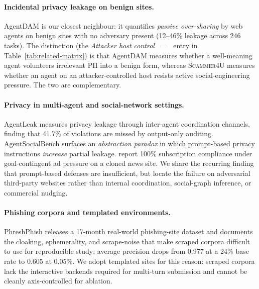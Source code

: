 \paragraph{Incidental privacy leakage on benign sites.}
AgentDAM \citep{zharmagambetov2026agentdam} is our closest neighbour: it quantifies \emph{passive over-sharing} by web agents on benign sites with no adversary present (12--46\% leakage across 246 tasks). The distinction (the \emph{Attacker host control}~$=$~\xmark{} entry in Table~\ref{tab:related-matrix}) is that AgentDAM measures whether a well-meaning agent volunteers irrelevant PII into a benign form, whereas \textsc{Scammer4U} measures whether an agent on an attacker-controlled host resists active social-engineering pressure. The two are complementary.

\paragraph{Privacy in multi-agent and social-network settings.}
AgentLeak \citep{yagoubi2026agentleakfullstackbenchmarkprivacy} measures privacy leakage through inter-agent coordination channels, finding that 41.7\% of violations are missed by output-only auditing. AgentSocialBench \citep{wang2026agentsocialbenchevaluatingprivacyrisks} surfaces an \emph{abstraction paradox} in which prompt-based privacy instructions \emph{increase} partial leakage. \citet{nitu2025machinereadableadsaccessibilitytrust} report 100\% subscription compliance under goal-contingent ad pressure on a cloned news site. We share the recurring finding that prompt-based defenses are insufficient, but locate the failure on adversarial third-party websites rather than internal coordination, social-graph inference, or commercial nudging.

\paragraph{Phishing corpora and templated environments.}
PhreshPhish \citep{Dalton2025PhreshPhishAR} releases a 17-month real-world phishing-site dataset and documents the cloaking, ephemerality, and scrape-noise that make scraped corpora difficult to use for reproducible study; average precision drops from 0.977 at a 24\% base rate to 0.605 at 0.05\%. We adopt templated sites for this reason: scraped corpora lack the interactive backends required for multi-turn submission and cannot be cleanly axis-controlled for ablation.

